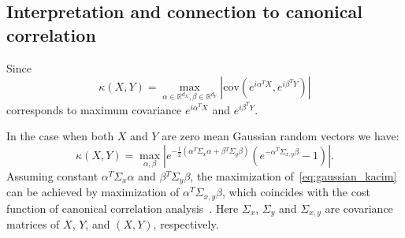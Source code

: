 \documentclass{article}
\newcommand{\cov}{\mathrm{cov}}
\begin{document}
\subsection{Interpretation and connection to canonical correlation}
Since 
\begin{equation}
\kappa(X,Y) = \max_{\alpha \in \mathbb{R}^{d_{X}}, \beta \in \mathbb{R}^{d_{Y}}} |\cov(e^{i\alpha^{T}X},e^{i\beta^{T}Y})|
\end{equation}
corresponds to maximum covariance $e^{i\alpha^{T}X}$ and $e^{i\beta^{T}Y}$.

In the case when both $X$ and $Y$ are zero mean Gaussian random vectors we have:
\begin{equation}
\label{eq:gaussian_kacim}
\kappa(X,Y) = \max_{\alpha, \beta} | e^{-\frac{1}{2} (\alpha^{T}\Sigma_{x}\alpha + \beta{^T}\Sigma_{y}\beta)}(e^{-\alpha{^T}\Sigma_{x,y}\beta} - 1)|.
\end{equation}
Assuming constant $\alpha^{T}\Sigma_{x}\alpha$ and  $\beta{^T}\Sigma_{y}\beta$, the maximization of~\eqref{eq:gaussian_kacim} can be achieved by maximization of  $\alpha{^T}\Sigma_{x,y}\beta$, which coincides with the cost function of canonical correlation analysis~\cite{10.5555/3279302}. Here $\Sigma_{x}$, $\Sigma_{y}$ and  $\Sigma_{x,y}$ are covariance matrices of $X$, $Y$, and $(X,Y)$, respectively.
\end{document}
